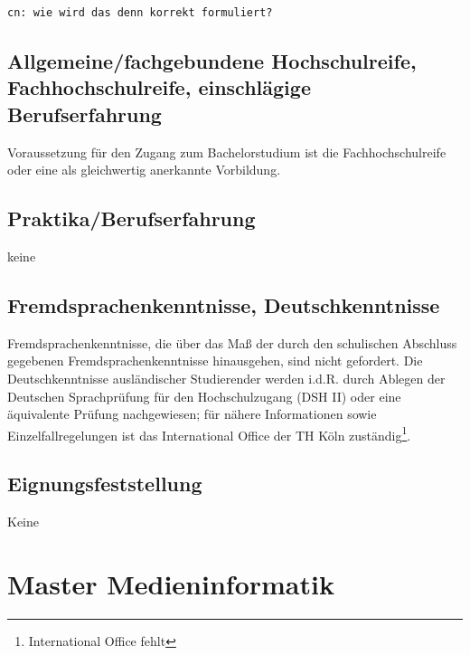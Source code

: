 \begin{verbatim}
cn: wie wird das denn korrekt formuliert?
\end{verbatim}

\subsection{Allgemeine/fachgebundene Hochschulreife,
Fachhochschulreife, einschlägige
Berufserfahrung}\label{allgemeinefachgebundene-hochschulreife-fachhochschulreife-einschluxe4gige-berufserfahrung}

Voraussetzung für den Zugang zum Bachelorstudium ist die
Fachhochschulreife oder eine als gleichwertig anerkannte Vorbildung.

\subsection{Praktika/Berufserfahrung}\label{praktikaberufserfahrung}

keine

\subsection{Fremdsprachenkenntnisse,
Deutschkenntnisse}\label{fremdsprachenkenntnisse-deutschkenntnisse}

Fremdsprachenkenntnisse, die über das Maß der durch den schulischen
Abschluss gegebenen Fremdsprachenkenntnisse hinausgehen, sind nicht
gefordert. Die Deutschkenntnisse ausländischer Studierender werden
i.d.R. durch Ablegen der Deutschen Sprachprüfung für den Hochschulzugang
(DSH II) oder eine äquivalente Prüfung nachgewiesen; für nähere
Informationen sowie Einzelfallregelungen ist das International Office
der TH Köln zuständig\footnote{International Office fehlt}.

\subsection{Eignungsfeststellung}\label{eignungsfeststellung}

Keine

\section{Master Medieninformatik}\label{master-medieninformatik-1}

